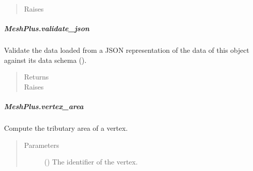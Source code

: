 \documentclass[letterpaper,10pt,english]{sphinxmanual}
\begin{document}
\begin{fulllineitems}
\begin{fulllineitems}
\begin{quote}
\begin{description}
\item[{Raises}] \leavevmode
{} \textendash{} 

\end{description}\end{quote}

\end{fulllineitems}



\subparagraph{MeshPlus.validate\_json}
\label{\detokenize{api/generated/directional_clustering.mesh.MeshPlus.validate_json:meshplus-validate-json}}\label{\detokenize{api/generated/directional_clustering.mesh.MeshPlus.validate_json::doc}}

\begin{fulllineitems}
\label{\detokenize{api/generated/directional_clustering.mesh.MeshPlus.validate_json:directional_clustering.mesh.MeshPlus.validate_json}}
Validate the data loaded from a JSON representation of the data of this object against its data schema ().
\begin{quote}\begin{description}
\item[{Returns}] \leavevmode
{}

\item[{Raises}] \leavevmode
{} \textendash{} 

\end{description}\end{quote}

\end{fulllineitems}



\subparagraph{MeshPlus.vertex\_area}
\label{\detokenize{api/generated/directional_clustering.mesh.MeshPlus.vertex_area:meshplus-vertex-area}}\label{\detokenize{api/generated/directional_clustering.mesh.MeshPlus.vertex_area::doc}}

\begin{fulllineitems}
\label{\detokenize{api/generated/directional_clustering.mesh.MeshPlus.vertex_area:directional_clustering.mesh.MeshPlus.vertex_area}}
Compute the tributary area of a vertex.
\begin{quote}\begin{description}
\item[{Parameters}] \leavevmode
{} () \textendash{} The identifier of the vertex.


\end{description}
\end{quote}
\end{fulllineitems}
\end{fulllineitems}
\end{document}
